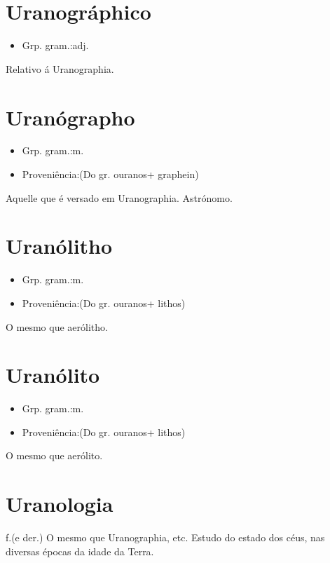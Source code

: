 \documentclass{article}
\begin{document}
\section{Uranográphico}
\begin{itemize}
\item {Grp. gram.:adj.}
\end{itemize}
Relativo á Uranographia.
\section{Uranógrapho}
\begin{itemize}
\item {Grp. gram.:m.}
\end{itemize}
\begin{itemize}
\item {Proveniência:(Do gr. \textunderscore ouranos\textunderscore  + \textunderscore graphein\textunderscore )}
\end{itemize}
Aquelle que é versado em Uranographia.
Astrónomo.
\section{Uranólitho}
\begin{itemize}
\item {Grp. gram.:m.}
\end{itemize}
\begin{itemize}
\item {Proveniência:(Do gr. \textunderscore ouranos\textunderscore  + \textunderscore lithos\textunderscore )}
\end{itemize}
O mesmo que \textunderscore aerólitho\textunderscore .
\section{Uranólito}
\begin{itemize}
\item {Grp. gram.:m.}
\end{itemize}
\begin{itemize}
\item {Proveniência:(Do gr. \textunderscore ouranos\textunderscore  + \textunderscore lithos\textunderscore )}
\end{itemize}
O mesmo que \textunderscore aerólito\textunderscore .
\section{Uranologia}
\textunderscore f.\textunderscore  (e der.)
O mesmo que \textunderscore Uranographia\textunderscore , etc.
Estudo do estado dos céus, nas diversas épocas da idade da Terra.
\end{document}
